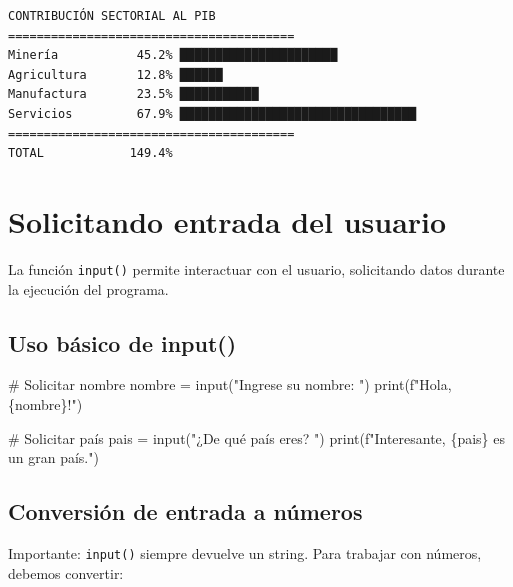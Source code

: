 \documentclass[
  doc,
  floatsintext,
  longtable,
  a4paper,
  nolmodern,
  notxfonts,
  notimes,
  12pt,
  colorlinks=true,linkcolor=blue,citecolor=blue,urlcolor=blue]{apa7}
\newenvironment{Shaded}{\begin{snugshade}}{\end{snugshade}}
\newcommand{\BuiltInTok}[1]{\textcolor[rgb]{0.00,0.23,0.31}{#1}}
\newcommand{\CommentTok}[1]{\textcolor[rgb]{0.37,0.37,0.37}{#1}}
\newcommand{\NormalTok}[1]{\textcolor[rgb]{0.00,0.23,0.31}{#1}}
\newcommand{\OperatorTok}[1]{\textcolor[rgb]{0.37,0.37,0.37}{#1}}
\newcommand{\SpecialCharTok}[1]{\textcolor[rgb]{0.37,0.37,0.37}{#1}}
\newcommand{\SpecialStringTok}[1]{\textcolor[rgb]{0.13,0.47,0.30}{#1}}
\newcommand{\StringTok}[1]{\textcolor[rgb]{0.13,0.47,0.30}{#1}}
\begin{document}
\begin{verbatim}
CONTRIBUCIÓN SECTORIAL AL PIB
========================================
Minería           45.2% ██████████████████████
Agricultura       12.8% ██████
Manufactura       23.5% ███████████
Servicios         67.9% █████████████████████████████████
========================================
TOTAL            149.4%
\end{verbatim}

\section{Solicitando entrada del
usuario}\label{solicitando-entrada-del-usuario}

La función \texttt{input()} permite interactuar con el usuario,
solicitando datos durante la ejecución del programa.

\subsection{Uso básico de input()}\label{uso-buxe1sico-de-input}

\begin{Shaded}
\begin{Highlighting}[]
\CommentTok{\# Solicitar nombre}
\NormalTok{nombre }\OperatorTok{=} \BuiltInTok{input}\NormalTok{(}\StringTok{"Ingrese su nombre: "}\NormalTok{)}
\BuiltInTok{print}\NormalTok{(}\SpecialStringTok{f"Hola, }\SpecialCharTok{\{}\NormalTok{nombre}\SpecialCharTok{\}}\SpecialStringTok{!"}\NormalTok{)}

\CommentTok{\# Solicitar país}
\NormalTok{pais }\OperatorTok{=} \BuiltInTok{input}\NormalTok{(}\StringTok{"¿De qué país eres? "}\NormalTok{)}
\BuiltInTok{print}\NormalTok{(}\SpecialStringTok{f"Interesante, }\SpecialCharTok{\{}\NormalTok{pais}\SpecialCharTok{\}}\SpecialStringTok{ es un gran país."}\NormalTok{)}
\end{Highlighting}
\end{Shaded}

\subsection{Conversión de entrada a
números}\label{conversiuxf3n-de-entrada-a-nuxfameros}

Importante: \texttt{input()} siempre devuelve un string. Para trabajar
con números, debemos convertir:
\end{document}
